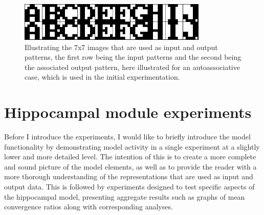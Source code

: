 \begin{figure}\label{fig:sample_letters}
    \centering
    \includegraphics[width=9cm]{fig/im_both.png}
    \caption{Illustrating the 7x7 images that are used as input and output patterns, the first row being the input patterns and the second being the associated output pattern, here illustrated for an autoassociative case, which is used in the initial experimentation.}
\end{figure}


\section{Hippocampal module experiments}\label{section:hpc-experiments}

Before I introduce the experiments, I would like to briefly introduce the model functionality by demonstrating model activity in a single experiment at a slightly lower and more detailed level. The intention of this is to create a more complete and sound picture of the model elements, as well as to provide the reader with a more thorough understanding of the representations that are used as input and output data. 
This is followed by experiments designed to test specific aspects of the hippocampal model, presenting aggregate results such as graphs of mean convergence ratios along with corresponding analyses.

